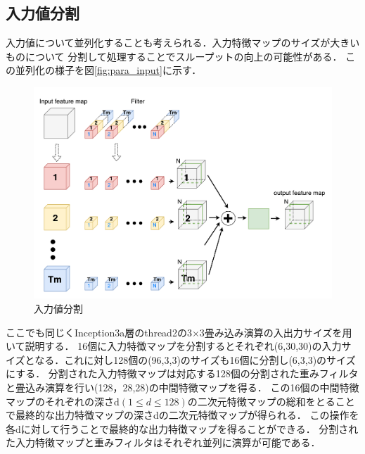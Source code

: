 {\subsection{入力値分割}
\label{subsec:para_input}
入力値について並列化することも考えられる．入力特徴マップのサイズが大きいものについて
分割して処理することでスループットの向上の可能性がある．
この並列化の様子を図\ref{fig:para_input}に示す．
\begin{figure}[h]
    \centering
    \includegraphics[width=12cm]{./chap5/fig/conv_para_input.pdf}
    \caption{入力値分割}
    \label{fig:conv_para_input}
\end{figure}
ここでも同じくInception3a層のthread2の3$\times$3畳み込み演算の入出力サイズを用いて説明する．
16個に入力特徴マップを分割するとそれぞれ(6,30,30)の入力サイズとなる．これに対し128個の(96,3,3)のサイズも16個に分割し(6,3,3)のサイズにする．
分割された入力特徴マップは対応する128個の分割された重みフィルタと畳込み演算を行い(128，28,28)の中間特徴マップを得る．
この16個の中間特徴マップのそれぞれの深さd$(1 \leq d \leq 128)$の二次元特徴マップの総和をとることで最終的な出力特徴マップの深さdの二次元特徴マップが得られる．
この操作を各dに対して行うことで最終的な出力特徴マップを得ることができる．
分割された入力特徴マップと重みフィルタはそれぞれ並列に演算が可能である．

}